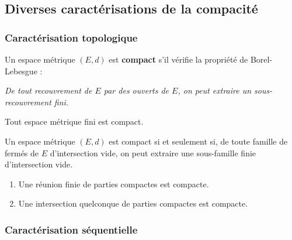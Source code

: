 




  \subsection{Diverses caractérisations de la compacité}

  \subsubsection{Caractérisation topologique}


  \begin{definition}
    Un espace métrique $(E, d)$ est \textbf{compact} s'il vérifie la propriété de Borel-Lebesgue :
    \begin{center}
      \textit{De tout recouvrement de $E$ par des ouverts de $E$, on peut extraire un sous-recouvrement fini.}
    \end{center}
  \end{definition}

  \begin{example}
    Tout espace métrique fini est compact.
  \end{example}

  \begin{proposition}
    Un espace métrique $(E, d)$ est compact si et seulement si, de toute famille de fermés de $E$ d'intersection vide, on peut extraire une sous-famille finie d'intersection vide.
  \end{proposition}

  \begin{proposition}
    \begin{enumerate}[label={\bfseries(\roman*)}]
      \item Une réunion finie de parties compactes est compacte.
      \item Une intersection quelconque de parties compactes est compacte.
    \end{enumerate}
  \end{proposition}

  \subsubsection{Caractérisation séquentielle}


